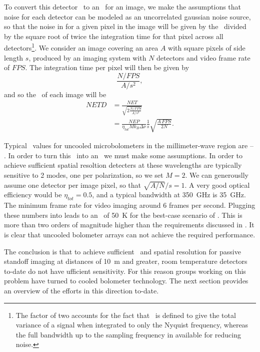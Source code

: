 To convert this detector \NET\ to an \NETD\ for an image, we make the assumptions that noise for each detector can be modeled as an uncorrelated gaussian noise source, so that the noise in for a given pixel in the image will be given by the \NET\ divided by the square root of twice the integration time for that pixel across all detectors\footnote{%
  The factor of two accounts for the fact that \NEP\ is defined to give the total variance of a signal when integrated to only the Nyquist frequency, whereas the full bandwidth up to the sampling frequency in available for reducing noise.
}. 
We consider an image covering an area $A$ with square pixels of side length $s$, produced by an imaging system with $N$ detectors and video frame rate of $FPS$.
The integration time per pixel will then be given by
\begin{equation}
  \frac{N / FPS}{A / s^2},
\end{equation}
and so the \NETD\ of each image will be
\begin{align}
  NETD & = \frac{NET}{\sqrt{ 2 \frac{N / FPS}{A / s^2}}} \\
       & = \frac{NEP}{\eta_{tot} M k_B \Delta \nu} \frac{1}{s} \sqrt{\frac{A\,FPS}{2 N}} .
       \label{eqn:ch1-netd-defn}
\end{align}

Typical \NEP\ values for uncooled microbolometers in the millimeter-wave region are -- \cite{nemarich_microbolometer_2005}.
In order to turn this \NEP\ into an \NETD\ we must make some assumptions.
In order to achieve sufficient spatial resoltion detecters at these wavelengths are typically sensitive to 2 modes, one per polarization, so we set $M = 2$.
We can generouslly assume one detector per image pixel, so that $\sqrt{A/N}/s = 1$.
A very good optical efficiency would be $\eta_{tot} = 0.5$, and a typical bandwidth at \SI{350}{\GHz} is \SI{35}{\GHz}.
The minimum frame rate for video imaging around 6 frames per second.
Plugging these numbers into  leads to an \NETD\ of \SI{50}{\K} for the best-case scenario of  \NEP.
This is more than two orders of magnitude higher than the requirements discussed in .
It is clear that uncooled bolometer arrays can not achieve the required performance.

The conclusion is that to achieve sufficient \NETD\ and spatial resolution for passive standoff imaging at distances of \SI{10}{\m} and greater, room temperature detectors to-date do not have ufficient sensitivity.
For this reason groups working on this problem have turned to cooled bolometer technology.
The next section provides an overview of the efforts in this direction to-date.

